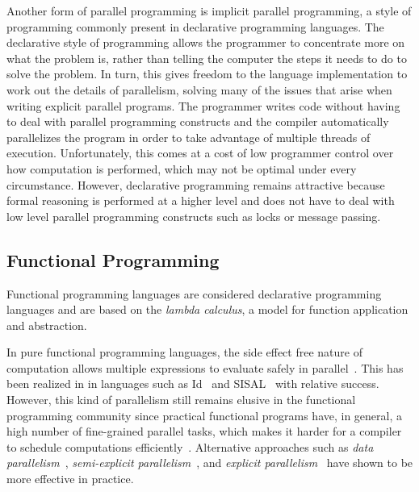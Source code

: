 Another form of parallel programming is implicit parallel programming, a style
of programming commonly present in declarative programming languages.  The
declarative style of programming allows the programmer to concentrate more on
what the problem is, rather than telling the computer the steps it needs to do
to solve the problem. In turn, this gives freedom to the language implementation
to work out the details of parallelism, solving many of the issues that arise
when writing explicit parallel programs. The programmer writes code without
having to deal with parallel programming constructs and the compiler
automatically parallelizes the program in order to take advantage of multiple
threads of execution. Unfortunately, this comes at a cost of low programmer
control over how computation is performed, which may not be optimal under every
circumstance. However, declarative programming remains attractive because formal
reasoning is performed at a higher level and does not have to deal with low
level parallel programming constructs such as locks or message passing.

\subsection{Functional Programming}

Functional programming languages are considered declarative programming
languages and are based on the \emph{lambda calculus}, a model for function
application and abstraction.

In pure functional programming languages, the side effect free nature of
computation allows multiple expressions to evaluate safely in
parallel~\cite{Loidl:2003}. This has been realized in in languages such as
Id~\cite{Nikhil93anoverview} and SISAL~\cite{gaudiot2001sisal} with relative
success. However, this kind of parallelism still remains elusive in the
functional programming community since practical functional programs have, in
general, a high number of fine-grained parallel tasks, which makes it harder for
a compiler to schedule computations efficiently~\cite{haskell_tutorial}.
Alternative approaches such as \emph{data
parallelism}~\cite{Blelloch:1996:PPA:227234.227246,Chakravarty07dataparallel,peytonjones:2008},
\emph{semi-explicit parallelism}~\cite{Marlow:2010,Fluet:2010}, and
\emph{explicit parallelism}~\cite{harris2005composable} have shown to be more
effective in practice.

